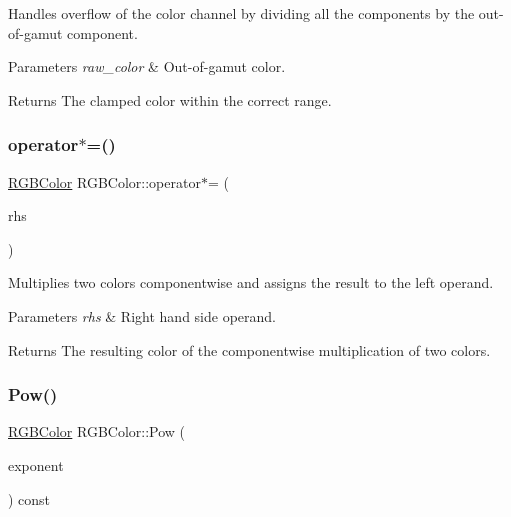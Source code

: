 Handles overflow of the color channel by dividing all the components by the out-\/of-\/gamut component. 
\begin{DoxyParams}{Parameters}
{\em raw\+\_\+color} & Out-\/of-\/gamut color. \\
\hline
\end{DoxyParams}
\begin{DoxyReturn}{Returns}
The clamped color within the correct range. 
\end{DoxyReturn}
\hypertarget{class_r_g_b_color_a3a748bcc5393c391b8d7edb5dc162246}{}\label{class_r_g_b_color_a3a748bcc5393c391b8d7edb5dc162246} 
\subsubsection{\texorpdfstring{operator$\ast$=()}{operator*=()}}
{\footnotesize\ttfamily \hyperlink{class_r_g_b_color}{R\+G\+B\+Color} R\+G\+B\+Color\+::operator$\ast$= (\begin{DoxyParamCaption}\item[{const \hyperlink{class_r_g_b_color}{R\+G\+B\+Color} \&}]{rhs }\end{DoxyParamCaption})}

Multiplies two colors componentwise and assigns the result to the left operand. 
\begin{DoxyParams}{Parameters}
{\em rhs} & Right hand side operand. \\
\hline
\end{DoxyParams}
\begin{DoxyReturn}{Returns}
The resulting color of the componentwise multiplication of two colors. 
\end{DoxyReturn}
\hypertarget{class_r_g_b_color_a70f29cb9404fac9686687bc58efaaca2}{}\label{class_r_g_b_color_a70f29cb9404fac9686687bc58efaaca2} 
\subsubsection{\texorpdfstring{Pow()}{Pow()}}
{\footnotesize\ttfamily \hyperlink{class_r_g_b_color}{R\+G\+B\+Color} R\+G\+B\+Color\+::\+Pow (\begin{DoxyParamCaption}\item[{const float}]{exponent }\end{DoxyParamCaption}) const}

